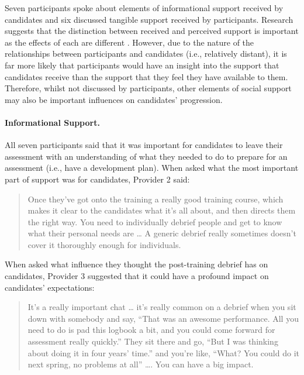 \documentclass[
  12pt,
  a4paper,
]{book}
\begin{document}
Seven participants spoke about elements of informational support received by candidates and six discussed tangible support received by participants. Research suggests that the distinction between received and perceived support is important as the effects of each are different \citep[cf.~][]{Rees2007}. However, due to the nature of the relationships between participants and candidates (i.e., relatively distant), it is far more likely that participants would have an insight into the support that candidates receive than the support that they feel they have available to them. Therefore, whilst not discussed by participants, other elements of social support may also be important influences on candidates' progression.

\hypertarget{qual-gta-development-plan}{%
\paragraph{Informational Support.}\label{qual-gta-development-plan}}

All seven participants said that it was important for candidates to leave their assessment with an understanding of what they needed to do to prepare for an assessment (i.e., have a development plan). When asked what the most important part of support was for candidates, Provider 2 said:

\begin{quote}
Once they've got onto the training a really good training course, which makes it clear to the candidates what it's all about, and then directs them the right way. You need to individually debrief people and get to know what their personal needs are \ldots{} A generic debrief really sometimes doesn't cover it thoroughly enough for individuals.
\end{quote}

When asked what influence they thought the post-training debrief has on candidates, Provider 3 suggested that it could have a profound impact on candidates' expectations:

\begin{quote}
It's a really important chat \ldots{} it's really common on a debrief when you sit down with somebody and say, ``That was an awesome performance. All you need to do is pad this logbook a bit, and you could come forward for assessment really quickly.'' They sit there and go, ``But I was thinking about doing it in four years' time.'' and you're like, ``What? You could do it next spring, no problems at all'' \ldots. You can have a big impact.
\end{quote}
\end{document}
